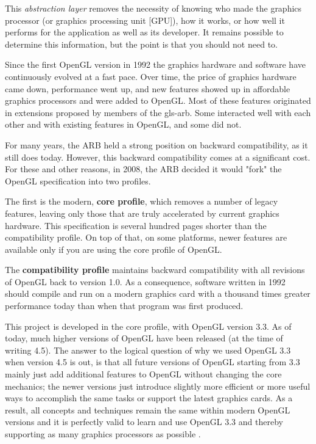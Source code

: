 This \emph{abstraction layer} \cite{superbible} removes the necessity of knowing who made the graphics processor (or graphics processing unit [GPU]), how it works, or how well it performs for the application as well as its developer. It remains possible to determine this information, but the point is that you should not need to.

 \label{opengl-profiles}

Since the first OpenGL version in 1992 \cite{superbible} the graphics hardware and software have continuously evolved at a fast pace. Over time, the price of graphics hardware came down, performance went up, and new features showed up in affordable graphics processors and were added to OpenGL. Most of these features originated in extensions proposed by members of the \gls{gls-arb}. Some interacted well with each other and with existing features in OpenGL, and some did not. 

For many years, the \gls{ARB} held a strong position on backward compatibility, as it still does today. However, this backward compatibility comes at a significant cost. 
For these and other reasons, in 2008, the ARB decided it would "fork" the OpenGL specification into two profiles. 

The first is the modern, \textbf{core profile}, which removes a number of legacy features, leaving only those that are truly accelerated by current graphics hardware. This specification is several hundred pages shorter than the compatibility profile. On top of that, on some platforms, newer features are available only if you are using the core profile of OpenGL.

The \textbf{compatibility profile} maintains backward compatibility with all revisions of OpenGL back to version 1.0. As a consequence, software written in 1992 should compile and run on a modern graphics card with a thousand times greater performance today than when that program was first produced.

This project is developed in the core profile, with OpenGL version 3.3. As of today, much higher versions of OpenGL have been released (at the time of writing 4.5). 
The answer to the logical question of why we used OpenGL 3.3 when version 4.5 is out, is that all future versions of OpenGL starting from 3.3 mainly just add additional features to OpenGL without changing the core mechanics; the newer versions just introduce slightly more efficient or more useful ways to accomplish the same tasks or support the latest graphics cards. As a result, all concepts and techniques remain the same within modern OpenGL versions and it is perfectly valid to learn and use OpenGL 3.3 and thereby supporting as many graphics processors as possible \cite{learnopengl}.

